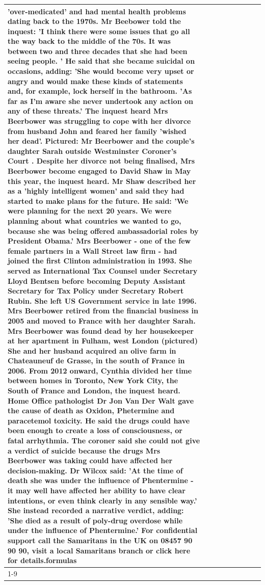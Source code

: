 \begin{table}[H]
\begin{tabular}{lllrlllll}
'over-medicated' and had mental health problems dating back to the 1970s. Mr Beebower told the inquest: 'I think there were some issues that go all the way back to the middle of the 70s. It was between two and three decades that she had been seeing people. ' He said that she became suicidal on occasions, adding: 'She would become very upset or angry and would make these kinds of statements and, for example, lock herself in the bathroom. 'As far as I'm aware she never undertook any action on any of these threats.' The inquest heard Mrs Beerbower was struggling to cope with her divorce from husband John and feared her family 'wished her dead'. Pictured: Mr Beerbower and the couple's daughter Sarah outside Westminster Coroner's Court . Despite her divorce not being finalised, Mrs Beerbower become engaged to David Shaw in May this year, the inquest heard. Mr Shaw described her as a 'highly intelligent women' and said they had started to make plans for the future. He said: 'We were planning for the next 20 years. We were planning about what countries we wanted to go, because she was being offered ambassadorial roles by President Obama.' Mrs Beerbower - one of the few female partners in a Wall Street law firm - had joined the first Clinton administration in 1993. She served as International Tax Counsel under Secretary Lloyd Bentsen before becoming Deputy Assistant Secretary for Tax Policy under Secretary Robert Rubin. She left US Government service in late 1996. Mrs Beerbower retired from the financial business in 2005 and moved to France with her daughter Sarah. Mrs Beerbower was found dead by her housekeeper at her apartment in Fulham, west London (pictured) She and her husband acquired an olive farm in Chateauneuf de Grasse, in the south of France in 2006. From 2012 onward, Cynthia divided her time between homes in Toronto, New York City, the South of France and London, the inquest heard. Home Office pathologist Dr Jon Van Der Walt gave the cause of death as Oxidon, Phetermine and paracetemol toxicity. He said the drugs could have been enough to create a loss of consciousness, or fatal arrhythmia. The coroner said she could not give a verdict of suicide because the drugs Mrs Beerbower was taking could have affected her decision-making. Dr Wilcox said: 'At the time of death she was under the influence of Phentermine - it may well have affected her ability to have clear intentions, or even think clearly in any sensible way.' She instead recorded a narrative verdict, adding: 'She died as a result of poly-drug overdose while under the influence of Phentermine.' For confidential support call the Samaritans in the UK on 08457 90 90 90, visit a local Samaritans branch or click here for details.formulas \\
\cline{1-9}
\bottomrule
\end{tabular}
\end{table}
